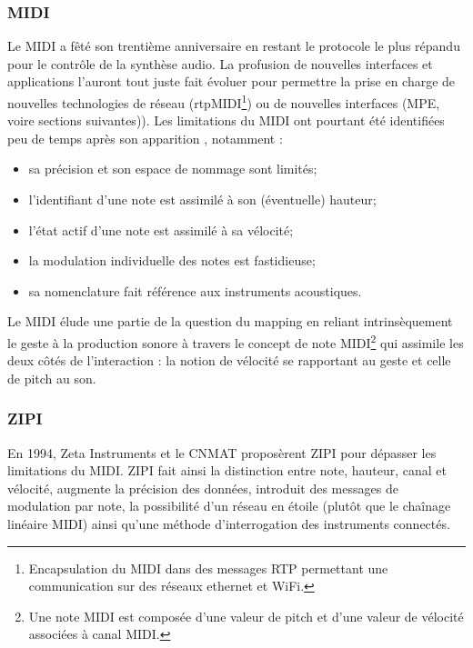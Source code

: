 \subsubsection{MIDI}
Le \gls{MIDI} a fêté son trentième anniversaire en restant le protocole le plus répandu pour le contrôle de la synthèse audio. La profusion de nouvelles interfaces et applications l'auront tout juste fait évoluer pour permettre la prise en charge de nouvelles technologies de réseau (rtpMIDI\footnote{ Encapsulation du \gls{MIDI} dans des messages \gls{RTP} permettant une communication sur des réseaux ethernet et WiFi.}) ou de nouvelles interfaces (\gls{MPE}, voire sections suivantes)).
Les limitations du \gls{MIDI} ont pourtant été identifiées peu de temps après son apparition \cite{mcmillen_zipi_1994}\cite{moore_dysfunctions_1988}\cite{selfridge-field_beyond_1997}, notamment :
\vspace{-1em}
\begin{itemize}[noitemsep]
	\item sa précision et son espace de nommage sont limités;
	\item l'identifiant d'une note est assimilé à son (éventuelle) hauteur;
	\item l'état actif d'une note est assimilé à sa vélocité;
	\item la modulation individuelle des notes est fastidieuse;
	\item sa nomenclature fait référence aux instruments acoustiques.
\end{itemize}

Le \gls{MIDI} élude une partie de la question du mapping en reliant intrinsèquement le geste à la production sonore à travers le concept de note \gls{MIDI}\footnote{ Une note \gls{MIDI} est composée d'une valeur de pitch et d'une valeur de vélocité associées à canal \gls{MIDI}.} qui assimile les deux côtés de l'interaction : la notion de vélocité se rapportant au geste et celle de pitch au son.

\subsubsection{ZIPI}
En 1994, Zeta Instruments et le \gls{CNMAT} proposèrent \gls{ZIPI}\cite{mcmillen_zipi_1994} pour dépasser les limitations du MIDI. \gls{ZIPI} fait ainsi la distinction entre note, hauteur, canal et vélocité, augmente la précision des données, introduit des messages de modulation par note, la possibilité d'un réseau en étoile (plutôt que le chaînage linéaire \gls{MIDI}) ainsi qu'une méthode d'interrogation des instruments connectés.

